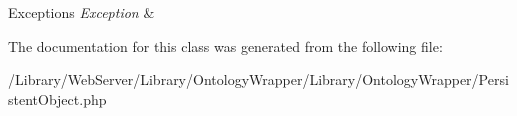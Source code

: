 \begin{DoxyExceptions}{Exceptions}
{\em Exception} & \\
\hline
\end{DoxyExceptions}


The documentation for this class was generated from the following file\-:\begin{DoxyCompactItemize}
\item 
/\-Library/\-Web\-Server/\-Library/\-Ontology\-Wrapper/\-Library/\-Ontology\-Wrapper/Persistent\-Object.\-php\end{DoxyCompactItemize}
